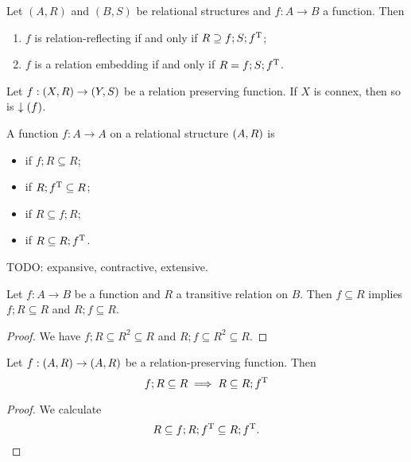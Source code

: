 \begin{lemma}
Let $(A, R)$ and $(B, S)$ be relational structures and $f: A\to B$ a function. Then
\begin{enumerate}
\item $f$ is relation-reflecting \textup{if and only if} $R \supseteq f;S;f^{\mathrm{T}}$;
\item $f$ is a relation embedding \textup{if and only if} $R = f;S;f^{\mathrm{T}}$.
\end{enumerate}
\end{lemma}

\begin{lemma} \label{connexityImage}
Let $f: \sSet{X,R} \to \sSet{Y,S}$ be a relation preserving function. If $X$ is connex, then so is $\downarrow(f)$.
\end{lemma}

\begin{definition}
A function $f: A\to A$ on a relational structure $\sSet{A, R}$ is
\begin{itemize}
\item {} if $f;R \subseteq R$;
\item {} if $R;f^{\mathrm{T}} \subseteq R$;
\item {} if $R \subseteq f;R$;
\item {} if $R \subseteq R;f^{\mathrm{T}}$.
\end{itemize}
\end{definition}

TODO: expansive, contractive, extensive.

\begin{lemma} \label{transitiveRestrictiveLemma}
Let $f: A\to B$ be a function and $R$ a transitive relation on $B$. Then $f\subseteq R$ implies $f;R\subseteq R$ and $R;f\subseteq R$.
\end{lemma}
\begin{proof}
We have $f;R\subseteq R^2 \subseteq R$ and $R;f \subseteq R^2 \subseteq R$.
\end{proof}

\begin{lemma} \label{expansiveRelationPreserving}
Let $f: \sSet{A,R} \to \sSet{A,R}$ be a relation-preserving function. Then
\[ f;R \subseteq R \implies R \subseteq R;f^{\mathrm{T}} \]
\end{lemma}
\begin{proof}
We calculate
\[ R \subseteq f;R;f^{\mathrm{T}} \subseteq R;f^{\mathrm{T}}. \]
\end{proof}

